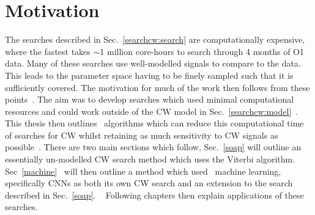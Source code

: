 \section{\label{searchcw:motivation}Motivation}

The searches described in Sec.~\ref{searchcw:search} are computationally
expensive, where the fastest takes $\sim$1 million core-hours to search through
4 months of O1 data.  Many of these searches use well-modelled signals to
compare to the data. This leads to the parameter space having to be finely
sampled such that it is sufficiently covered.  The motivation for much of the
work then follows from these points~. The aim was
to develop searches which used minimal computational resources and could work
outside of the \gls{CW} model in Sec.~\ref{searchcw:model}~.  This thesis then
outlines~ algorithms which can reduce this computational
time of searches for \gls{CW} whilst retaining as much sensitivity to \gls{CW}
signals as possible~.  There are two main sections which follow,
Sec.~\ref{soap} will outline an essentially un-modelled \gls{CW} search method
which uses the Viterbi algorithm.  Sec~\ref{machine}~ will then outline a method which used~ machine
learning, specifically \glspl{CNN} as both its own \gls{CW} search and an
extension to the search described in Sec.~\ref{soap}.  ~ Following
chapters then explain applications of these searches.~


